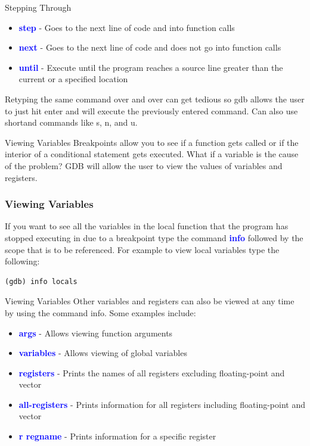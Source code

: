 \documentclass[11pt]{beamer}
\begin{document}
\begin{frame}{Stepping Through}
\begin{itemize}
        \item \textbf{\textcolor{blue}{step}} - Goes to the next line of code and into function calls
        \item \textbf{\textcolor{blue}{next}} - Goes to the next line of code and does not go into function calls
        \item \textbf{\textcolor{blue}{until}} - Execute until the program reaches a source line greater than the current or a specified location
\end{itemize}
Retyping the same command over and over can get tedious so gdb allows the user to just hit enter and will execute the previously entered command. Can also use shortand commands like s, n, and u.
\end{frame}

\begin{frame}{Viewing Variables}
Breakpoints allow you to see if a function gets called or if the interior of a conditional statement gets executed.
\break
\break
What if a variable is the cause of the problem? 
\break
\break
GDB will allow the user to view the values of variables and registers.
\end{frame}


\begin{frame}[fragile]
\frametitle{Viewing Variables}
If you want to see all the variables in the local function that the program has stopped executing in due to a breakpoint type the command \textbf{\textcolor{blue}{info}} followed by the scope that is to be referenced. 
\break
\break
For example to view local variables type the following:
\begin{lstlisting}[style=BashInputStyle]
(gdb) info locals
\end{lstlisting}
\end{frame}

\begin{frame}{Viewing Variables}
Other variables and registers can also be viewed at any time by using the command info. Some examples include:
\begin{itemize}
\item \textbf{\textcolor{blue}{args}} - Allows viewing function arguments
\item \textbf{\textcolor{blue}{variables}} - Allows viewing of global variables
\item \textbf{\textcolor{blue}{registers}} - Prints the names of all registers excluding floating-point and vector
\item \textbf{\textcolor{blue}{all-registers}} - Prints information for all registers including floating-point and vector
\item \textbf{\textcolor{blue}{r regname}} - Prints information for a specific register
\end{itemize}
\end{frame}
\end{document}
